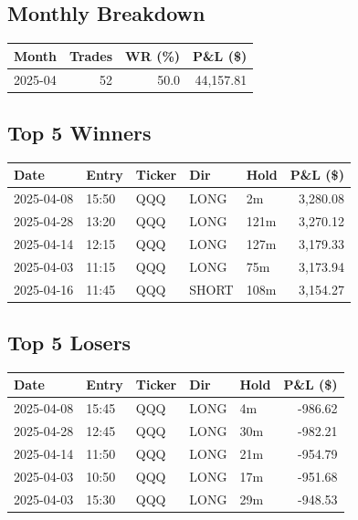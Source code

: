 \documentclass[11pt,a4paper,twoside]{article}
\begin{document}
\subsection{Monthly Breakdown}
\noindent\begin{center}
\begin{tabular}{>{\color{txtmain}}l rrr}
\toprule
\rowcolor{cardbg}
\textbf{Month} & \textbf{Trades} & \textbf{WR (\%)} & \textbf{P\&L (\$)} \\
\midrule
2025-04 & 52 & 50.0 & \textcolor{wingreen}{44,157.81} \\
\bottomrule
\end{tabular}
\end{center}
\subsection{Top 5 Winners}
\noindent\begin{center}
\begin{tabular}{>{\color{txtmain}}l llll r}
\toprule
\rowcolor{cardbg}
\textbf{Date} & \textbf{Entry} & \textbf{Ticker} & \textbf{Dir} & \textbf{Hold} & \textbf{P\&L (\$)} \\
\midrule
2025-04-08 & 15:50 & QQQ & LONG & 2m & \textcolor{wingreen}{3,280.08} \\
2025-04-28 & 13:20 & QQQ & LONG & 121m & \textcolor{wingreen}{3,270.12} \\
2025-04-14 & 12:15 & QQQ & LONG & 127m & \textcolor{wingreen}{3,179.33} \\
2025-04-03 & 11:15 & QQQ & LONG & 75m & \textcolor{wingreen}{3,173.94} \\
2025-04-16 & 11:45 & QQQ & SHORT & 108m & \textcolor{wingreen}{3,154.27} \\
\bottomrule
\end{tabular}
\end{center}
\subsection{Top 5 Losers}
\noindent\begin{center}
\begin{tabular}{>{\color{txtmain}}l llll r}
\toprule
\rowcolor{cardbg}
\textbf{Date} & \textbf{Entry} & \textbf{Ticker} & \textbf{Dir} & \textbf{Hold} & \textbf{P\&L (\$)} \\
\midrule
2025-04-08 & 15:45 & QQQ & LONG & 4m & \textcolor{lossred}{-986.62} \\
2025-04-28 & 12:45 & QQQ & LONG & 30m & \textcolor{lossred}{-982.21} \\
2025-04-14 & 11:50 & QQQ & LONG & 21m & \textcolor{lossred}{-954.79} \\
2025-04-03 & 10:50 & QQQ & LONG & 17m & \textcolor{lossred}{-951.68} \\
2025-04-03 & 15:30 & QQQ & LONG & 29m & \textcolor{lossred}{-948.53} \\
\bottomrule
\end{tabular}
\end{center}
\clearpage
\end{document}
